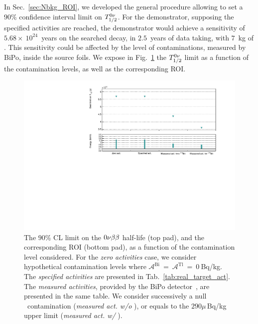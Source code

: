 In Sec.~\ref{sec:Nbkg_ROI}, we developed the general procedure allowing to set a $90\%$ confidence interval limit on $T_{1/2}^{0\nu}$.
For the demonstrator, supposing the specified activities are reached, the demonstrator would achieve a sensitivity of $5.68\times~10^{24}$~years on the searched decay, in $2.5$~years of data taking, with $7$~kg of \Se.
This sensitivity could be affected by the level of contaminations, measured by BiPo, inside the source foils.
We expose in Fig.~\ref{fig:real_target_act} the $T_{1/2}^{0\nu}$ limit as a function of the contamination levels, as well as the corresponding ROI.
\begin{figure}[h]
  \centering
  \includegraphics[width=1.1\textwidth]{Sensitivity/fig_sensitivity/contamination_level_Se_B.pdf}
  \caption{The $90\%$ CL limit on the $0\nu\beta\beta$ half-life (top pad), and the corresponding ROI (bottom pad), as a function of the contamination level considered.
    For the \emph{zero activities} case, we consider hypothetical contamination levels where $\mathcal{A}^{\text{Bi}}~=~\mathcal{A}^{\text{Tl}}~=~0~$Bq/kg.
    The \emph{specified activities} are presented in Tab.~\ref{tab:real_target_act}.
    The \emph{measured activities}, provided by the BiPo detector~\cite{internal:bipo}, are presented in the same table.
    We consider successively a null \Bi\ contamination (\emph{measured act. w/o \Bi}), or equals to the $290\mu\,$Bq/kg upper limit (\emph{measured act. w/ \Bi}).
    \label{fig:real_target_act}}
\end{figure}
